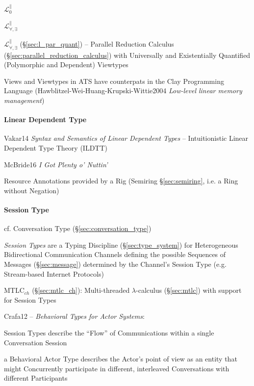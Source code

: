 $\mathcal{L}^\parallel_0$

$\mathcal{L}^\parallel_{\forall, \exists}$

\fist $\mathcal{L}^\parallel_{\forall,\exists}$
(\S\ref{sec:l_par_quant}) -- Parallel Reduction Calculus
(\S\ref{sec:parallel_reduction_calculus}) with Universally and
Existentially Quantified (Polymorphic and Dependent) Viewtypes

Views and Viewtypes in ATS have counterpats in the Clay Programming
Language (Hawblitzel-Wei-Huang-Krupski-Wittie2004 \emph{Low-level
  linear memory management})



\paragraph{Linear Dependent Type}\label{sec:dependent_linear}\hfill

Vakar14 \emph{Syntax and Semantics of Linear Dependent Types} --
Intuitionistic Linear Dependent Type Theory (ILDTT)

McBride16 \emph{I Got Plenty o' Nuttin'}

Resource Annotations provided by a Rig (Semiring \S\ref{sec:semiring},
i.e. a Ring without Negation)



\paragraph{Session Type}\label{sec:session_type}\hfill

\fist cf. Conversation Type (\S\ref{sec:conversation_type})

\emph{Session Types} are a Typing Discipline (\S\ref{sec:type_system})
for Heterogeneous Bidirectional Communication Channels defining the
possible Sequences of Messages (\S\ref{sec:message}) determined by the
Channel's Session Type (e.g. Stream-based Internet Protocols)
\cite{neubauer-thiemann04}

\fist MTLC$_{ch}$ (\S\ref{sec:mtlc_ch}): Multi-threaded
$\lambda$-calculus (\S\ref{sec:mtlc}) with support for Session Types

Crafa12 -- \emph{Behavioral Types for Actor Systems}:

Session Types describe the ``Flow'' of Communications within a single
Conversation Session

a Behavioral Actor Type describes the Actor's point of view as an
entity that might Concurrently participate in different, interleaved
Conversations with different Participants

